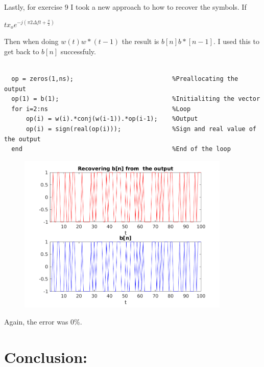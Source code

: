 \documentclass[a4paper,11pt]{article}
\begin{document}
\newpage

Lastly, for exercise 9 I took a new approach to how to recover the symbols. If

\begin{center}
  $tx_o e^{-j(\pi 2\Delta f t + \displaystyle\frac{\pi}{2})}$
\end{center}

Then when doing $w(t)w*(t-1)$ the result is $b[n]b*[n-1]$. I used this to get
back to $b[n]$ successfuly.

\bigskip

\begin{lstlisting}

  op = zeros(1,ns);                           %Preallocating the output
  op(1) = b(1);                               %Initialiting the vector
  for i=2:ns                                  %Loop
      op(i) = w(i).*conj(w(i-1)).*op(i-1);    %Output
      op(i) = sign(real(op(i)));              %Sign and real value of the output
  end                                         %End of the loop

\end{lstlisting}

\bigskip

\begin{figure}[!hp]
    \begin{center}
      \includegraphics[width=0.9\textwidth]{images/exercise9.png}
    \end{center}
\end{figure}

Again, the error was 0\%.

\newpage

\section{Conclusion:}
\end{document}
